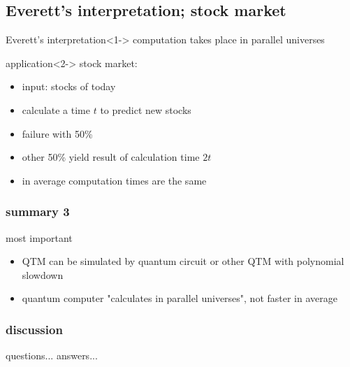 \documentclass{beamer}
\begin{document}
\subsection{Everett's interpretation; stock market}
\begin{frame}
	\begin{block}{Everett's interpretation}<1->
		computation takes place in parallel universes
	\end{block}
	\begin{block}{application}<2->
		stock market:
		\begin{itemize}
			\item input: stocks of today
			\item calculate a time $t$ to predict new stocks
			\item failure with 50\%
			\item other 50\% yield result of calculation time $2t$
			\item in average computation times are the same
		\end{itemize}
	\end{block}
\end{frame}
%
\begin{frame}
	\frametitle{summary 3}
	\begin{block}{most important}
		\begin{itemize}
			\item<1-> QTM can be simulated by quantum circuit or other QTM with polynomial slowdown
			\item<2-> quantum computer "calculates in parallel universes", not faster in average
		\end{itemize}
	\end{block}
\end{frame}
%
\begin{frame}
	\tableofcontents
\end{frame}
%
\begin{frame}
	\frametitle{discussion}
	\begin{block}{questions...}
		answers...
	\end{block}
\end{frame}
%
\end{document}
